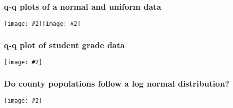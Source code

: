 \documentclass{beamer}
\newcommand{\fig}[2]{\centerline{\texttt{[image: \#2]}}}
\newcommand{\figg}[2]{\texttt{[image: \#2]}}
\newcommand{\bfr}[1]{\begin{frame}[fragile]\frametitle{{ #1 }}}
\begin{document}
\bfr{q-q plots of a normal and uniform data}
\figg{0.5}{qqnorm-norm}\hfill\figg{0.5}{qqnorm-unif}
\end{frame}


\bfr{q-q plot of student grade data}
\fig{.7}{student-grades-qq-1.png}
\end{frame}

\bfr{Do county populations follow a log normal distribution?}
\fig{0.7}{county-populations-qq-1.png}
\end{frame}
\end{document}
